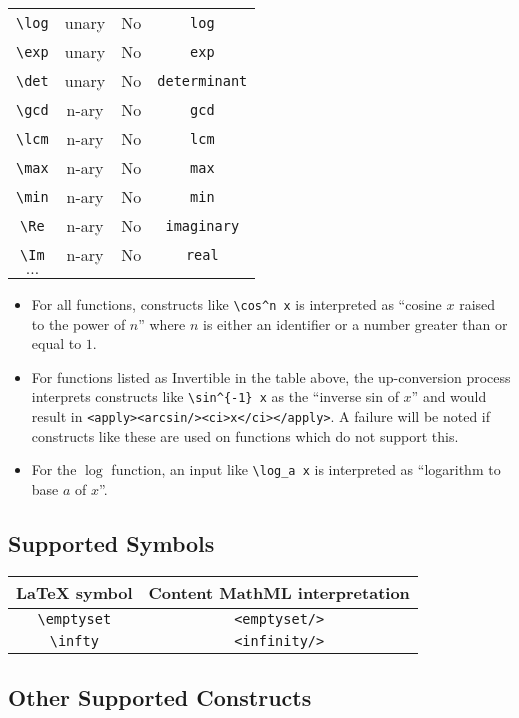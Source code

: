 \begin{tabular}{|c|c|c|c|}
\verb|\log| & unary & No & \verb|log| \\
\verb|\exp| & unary & No & \verb|exp| \\
\verb|\det| & unary & No & \verb|determinant| \\
\verb|\gcd| & n-ary & No & \verb|gcd| \\
\verb|\lcm| & n-ary & No & \verb|lcm| \\
\verb|\max| & n-ary & No & \verb|max| \\
\verb|\min| & n-ary & No & \verb|min| \\
\verb|\Re| & n-ary & No & \verb|imaginary| \\
\verb|\Im| & n-ary & No & \verb|real| \\
$\ldots$ & & & \\
\hline
\end{tabular}

\begin{itemize}
\item
  For all functions, constructs like \verb|\cos^n x| is
  interpreted as ``cosine $x$ raised to the power of $n$''
  where $n$ is either an identifier or a number greater than
  or equal to $1$.

\item
  For functions listed as Invertible in the table above,
  the up-conversion process interprets constructs like
  \verb|\sin^{-1} x| as the ``inverse sin of $x$''
  and would result in \verb|<apply><arcsin/><ci>x</ci></apply>|.
  A failure will be noted if constructs like these are
  used on functions which do not support this.

\item
  For the $\log$ function, an input like \verb|\log_a x|
  is interpreted as ``logarithm to base $a$ of $x$''.
\end{itemize}

\subsection*{Supported Symbols}

\begin{tabular}{|c|c|}
\hline
LaTeX symbol & Content MathML interpretation \\
\hline
\verb|\emptyset| & \verb|<emptyset/>| \\
\verb|\infty| & \verb|<infinity/>| \\
\hline
\end{tabular}

\subsection*{Other Supported Constructs}


